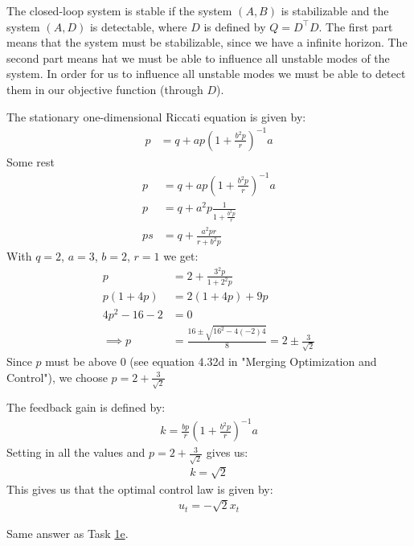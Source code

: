 \documentclass[11pt, a4paper, english]{NTNUoving}
\begin{document}
\begin{oppgave}
    \begin{punkt}
        \label{1e}
        The closed-loop system is stable if the system $(A,B)$ is stabilizable and the system $(A,D)$ is detectable,
        where $D$ is defined by $Q=D^\top D$. The first part means that the system must be stabilizable, since we have a infinite horizon.
        The second part means hat we must be able to influence all unstable modes of the system. In order for us to influence
        all unstable modes we must be able to detect them in our objective function (through $D$).
    \end{punkt}
\end{oppgave}

\begin{oppgave}

    \begin{punkt}
        The stationary one-dimensional Riccati equation is given by:
        \begin{align*}
            p &= q + ap(1+\frac{b^2p}{r})^{-1}a
        \end{align*}
        Some rest
        \begin{align*}
            p &= q + ap(1+\frac{b^2p}{r})^{-1}a \\
            p &= q + a^2p \frac{1}{1+\frac{b^2p}{r}} \\
            p s&= q + \frac{a^2pr}{r+b^2p}
        \end{align*}
        With $q=2$, $a=3$, $b=2$, $r=1$ we get:
        \begin{align*}
            p &= 2 + \frac{3^2p}{1+2^2p} \\
            p(1+4p) &=2(1+4p)+9p \\
            4p^2 - 16 -2 &= 0 \\
            \implies p &= \frac{16 \pm \sqrt{16^2-4(-2)4}}{8} = 2 \pm \frac{3}{\sqrt{2}}
        \end{align*}
        Since $p$ must be above 0 (see equation 4.32d in "Merging Optimization and Control"), we choose
        $p = 2 + \frac{3}{\sqrt{2}}$
    \end{punkt}

    \begin{punkt}
        The feedback gain is defined by:
        \begin{align*}
            k = \frac{bp}{r}(1 + \frac{b^2p}{r})^{-1}a
        \end{align*}
        Setting in all the values and $p = 2 + \frac{3}{\sqrt{2}}$ gives us:
        \begin{align*}
            k = \sqrt{2}
        \end{align*}
        This gives us that the optimal control law is given by:
        \begin{align*}
            u_t = -\sqrt{2}x_t
        \end{align*}
    \end{punkt}

    \begin{punkt}
        Same answer as Task \hyperref[1e]{1e}.
    \end{punkt}
\end{oppgave}

\begin{oppgave}

\end{oppgave}
\end{document}
